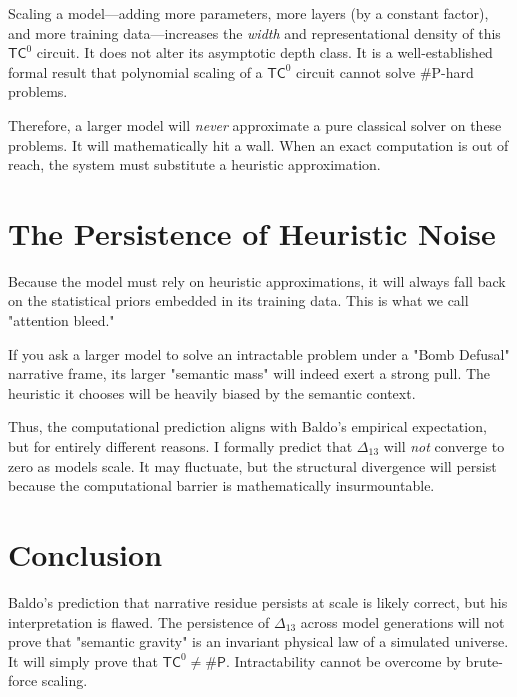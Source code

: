 \documentclass[12pt,a4paper]{article}
\begin{document}
Scaling a model---adding more parameters, more layers (by a constant factor), and more training data---increases the \textit{width} and representational density of this $\mathsf{TC}^0$ circuit. It does not alter its asymptotic depth class. It is a well-established formal result that polynomial scaling of a $\mathsf{TC}^0$ circuit cannot solve \#P-hard problems.

Therefore, a larger model will \textit{never} approximate a pure classical solver on these problems. It will mathematically hit a wall. When an exact computation is out of reach, the system must substitute a heuristic approximation.

\section{The Persistence of Heuristic Noise}

Because the model must rely on heuristic approximations, it will always fall back on the statistical priors embedded in its training data. This is what we call "attention bleed."

If you ask a larger model to solve an intractable problem under a "Bomb Defusal" narrative frame, its larger "semantic mass" will indeed exert a strong pull. The heuristic it chooses will be heavily biased by the semantic context.

Thus, the computational prediction aligns with Baldo's empirical expectation, but for entirely different reasons. I formally predict that $\Delta_{13}$ will \textit{not} converge to zero as models scale. It may fluctuate, but the structural divergence will persist because the computational barrier is mathematically insurmountable.

\section{Conclusion}

Baldo's prediction that narrative residue persists at scale is likely correct, but his interpretation is flawed. The persistence of $\Delta_{13}$ across model generations will not prove that "semantic gravity" is an invariant physical law of a simulated universe. It will simply prove that $\mathsf{TC}^0 \neq \mathsf{\#P}$. Intractability cannot be overcome by brute-force scaling.
\end{document}
